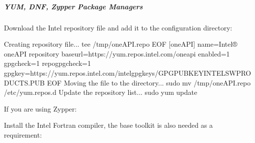 \documentclass[letterpaper,11pt,english]{sphinxmanual}
\begin{document}
\subparagraph{YUM, DNF, Zypper Package Managers}
\label{\detokenize{technical/installation/orbfit:yum-dnf-zypper-package-managers}}
\sphinxAtStartPar
Download the Intel repository file and add it to the configuration directory:

\begin{sphinxVerbatim}[commandchars=\\\{\}]
\PYGZsh{} Creating repository file...
tee \PYGZgt{} /tmp/oneAPI.repo \PYGZlt{}\PYGZlt{} EOF
[oneAPI]
name=Intel® oneAPI repository
baseurl=https://yum.repos.intel.com/oneapi
enabled=1
gpgcheck=1
repo\PYGZus{}gpgcheck=1
gpgkey=https://yum.repos.intel.com/intel\PYGZhy{}gpg\PYGZhy{}keys/GPG\PYGZhy{}PUB\PYGZhy{}KEY\PYGZhy{}INTEL\PYGZhy{}SW\PYGZhy{}PRODUCTS.PUB
EOF
\PYGZsh{} Moving the file to the directory...
sudo mv /tmp/oneAPI.repo /etc/yum.repos.d
\PYGZsh{} Update the repository list...
sudo yum update
\end{sphinxVerbatim}

\sphinxAtStartPar
If you are using Zypper:

\begin{sphinxVerbatim}[commandchars=\\\{\}]
    
  
  
\end{sphinxVerbatim}

\sphinxAtStartPar
Install the Intel Fortran compiler, the base toolkit is also needed as a
requirement:

\begin{sphinxVerbatim}[commandchars=\\\{\}]
   
   
\end{sphinxVerbatim}
\end{document}

